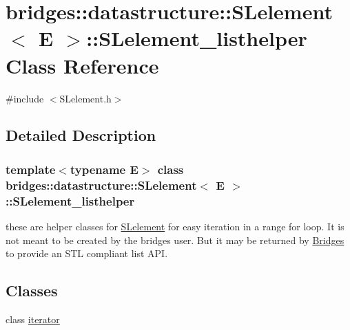 \hypertarget{classbridges_1_1datastructure_1_1_s_lelement_1_1_s_lelement__listhelper}{}\section{bridges\+:\+:datastructure\+:\+:S\+Lelement$<$ E $>$\+:\+:S\+Lelement\+\_\+listhelper Class Reference}
\label{classbridges_1_1datastructure_1_1_s_lelement_1_1_s_lelement__listhelper}


{\ttfamily \#include $<$S\+Lelement.\+h$>$}



\subsection{Detailed Description}
\subsubsection*{template$<$typename E$>$\newline
class bridges\+::datastructure\+::\+S\+Lelement$<$ E $>$\+::\+S\+Lelement\+\_\+listhelper}

these are helper classes for \mbox{\hyperlink{classbridges_1_1datastructure_1_1_s_lelement}{S\+Lelement}} for easy iteration in a range for loop. It is not meant to be created by the bridges user. But it may be returned by \mbox{\hyperlink{classbridges_1_1_bridges}{Bridges}} to provide an S\+TL compliant list A\+PI. \subsection*{Classes}
\begin{DoxyCompactItemize}
\item 
class \mbox{\hyperlink{classbridges_1_1datastructure_1_1_s_lelement_1_1_s_lelement__listhelper_1_1iterator}{iterator}}
\end{DoxyCompactItemize}
